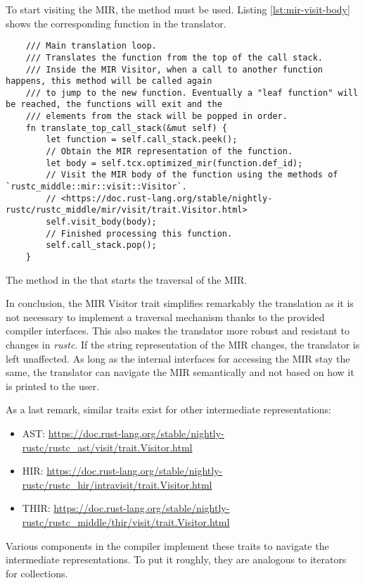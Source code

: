 To start visiting the MIR, the method  must be used.
Listing \ref{lst:mir-visit-body} shows the corresponding function in the translator.

\begin{listing}[!htb]
  \begin{verbatim}
    /// Main translation loop.
    /// Translates the function from the top of the call stack.
    /// Inside the MIR Visitor, when a call to another function happens, this method will be called again
    /// to jump to the new function. Eventually a "leaf function" will be reached, the functions will exit and the
    /// elements from the stack will be popped in order.
    fn translate_top_call_stack(&mut self) {
        let function = self.call_stack.peek();
        // Obtain the MIR representation of the function.
        let body = self.tcx.optimized_mir(function.def_id);
        // Visit the MIR body of the function using the methods of `rustc_middle::mir::visit::Visitor`.
        // <https://doc.rust-lang.org/stable/nightly-rustc/rustc_middle/mir/visit/trait.Visitor.html>
        self.visit_body(body);
        // Finished processing this function.
        self.call_stack.pop();
    }    
  \end{verbatim}
  \caption{The method in the  that starts the traversal of the \acrshort{MIR}.}
  \label{lst:mir-visit-body}
\end{listing}

In conclusion, the \acrshort{MIR} Visitor trait simplifies remarkably the translation
as it is not necessary to implement a traversal mechanism thanks to the provided
compiler interfaces.
This also makes the translator more robust and resistant to changes in \emph{rustc}.
If the string representation of the \acrshort{MIR} changes, the translator is left unaffected.
As long as the internal interfaces for accessing the \acrshort{MIR} stay the same,
the translator can navigate the \acrshort{MIR} semantically and not based on how it is printed to the user.

As a last remark, similar traits exist for other intermediate representations:

\begin{itemize}
  \item \acrshort{AST}: \url{https://doc.rust-lang.org/stable/nightly-rustc/rustc_ast/visit/trait.Visitor.html}
  \item \acrshort{HIR}: \url{https://doc.rust-lang.org/stable/nightly-rustc/rustc_hir/intravisit/trait.Visitor.html}
  \item \acrshort{THIR}: \url{https://doc.rust-lang.org/stable/nightly-rustc/rustc_middle/thir/visit/trait.Visitor.html}
\end{itemize}

Various components in the compiler implement these traits
to navigate the intermediate representations.
To put it roughly, they are analogous to iterators for collections.